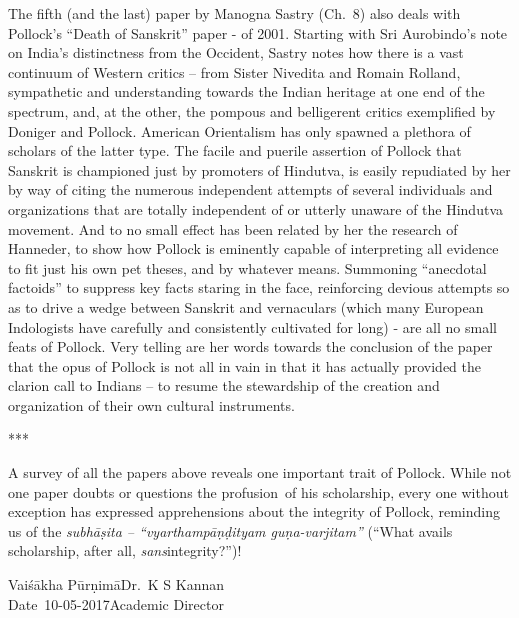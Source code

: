 The fifth (and the last) paper by Manogna Sastry (Ch.~8) also deals with Pollock’s “Death of Sanskrit” paper - of 2001. Starting with Sri Aurobindo’s note on India’s distinctness from the Occident, Sastry notes how there is a vast continuum of Western critics – from Sister Nivedita and Romain Rolland, sympathetic and understanding towards the Indian heritage at one end of the spectrum, and, at the other, the pompous and belligerent critics exemplified by Doniger and Pollock. American Orientalism has only spawned a plethora of scholars of the latter type. The facile and puerile assertion of Pollock  that Sanskrit is championed just by promoters of Hindutva,  is easily repudiated by her by way of citing the numerous independent attempts of several individuals and organizations that are totally independent of or utterly unaware of the Hindutva movement. And to no small effect has been related by her the research of Hanneder, to show how Pollock is eminently capable of interpreting all evidence to fit just his own pet theses, and by whatever means. Summoning “anecdotal factoids” to suppress key facts staring in the face, reinforcing devious attempts so as to drive a wedge between Sanskrit and vernaculars (which many European Indologists have carefully and consistently cultivated for long) - are all no small feats of Pollock. Very telling are her words towards the conclusion of the paper that the opus of Pollock is not all in vain in that it has actually provided the clarion call to Indians – to resume the stewardship of the creation and organization of their own cultural instruments.

\begin{center}***\end{center}

A survey of all the papers above reveals one important trait of Pollock. While not one paper doubts or questions the profusion~of his scholarship, every one without exception has expressed apprehensions about the integrity of Pollock, reminding us of the {\sl subhāṣita –  “vyartham\break pāṇḍityam guṇa-varjitam”} (“What avails scholarship, after all, {\sl sans}\break integrity?”)! 
\bigskip

\noindent
Vaiśākha Pūrṇimā\hfill	Dr.~K S Kannan\\
Date~10-05-2017\hfill	Academic Director






